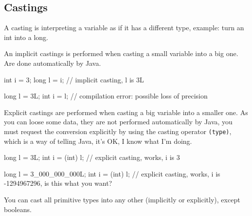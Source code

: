 \documentclass[8pt, a4paper, oneside]{extarticle}
\begin{document}
\begin{multicols}{2}
\columnbreak
{}
\end{multicols}

\subsection{Castings}

A casting is interpreting a variable as if it has a different type, example:
turn an int into a long.

An implicit castings is performed when casting a small variable into a big one.
Are done automatically by Java.

\begin{blackboard}
int i = 3;
long l = i; // implicit casting, l is 3L

long l = 3L;
int i = l; // compilation error: possible loss of precision
\end{blackboard}

Explicit castings are performed when casting a big variable into a smaller one.
As you can loose some data, they are not performed automatically by Java, you
must request the conversion explicitly by using the casting operator
\verb+(type)+, which is a way of telling Java, it's OK, I know what I'm doing.

\begin{blackboard}
long l = 3L;
int i = (int) l; // explicit casting, works, i is 3

long l = 3_000_000_000L;
int i = (int) l; // explicit casting, works, i is -1294967296, is this what you want?
\end{blackboard}

You can cast all primitive types into any other (implicitly or explicitly),
except booleans.
\end{document}
